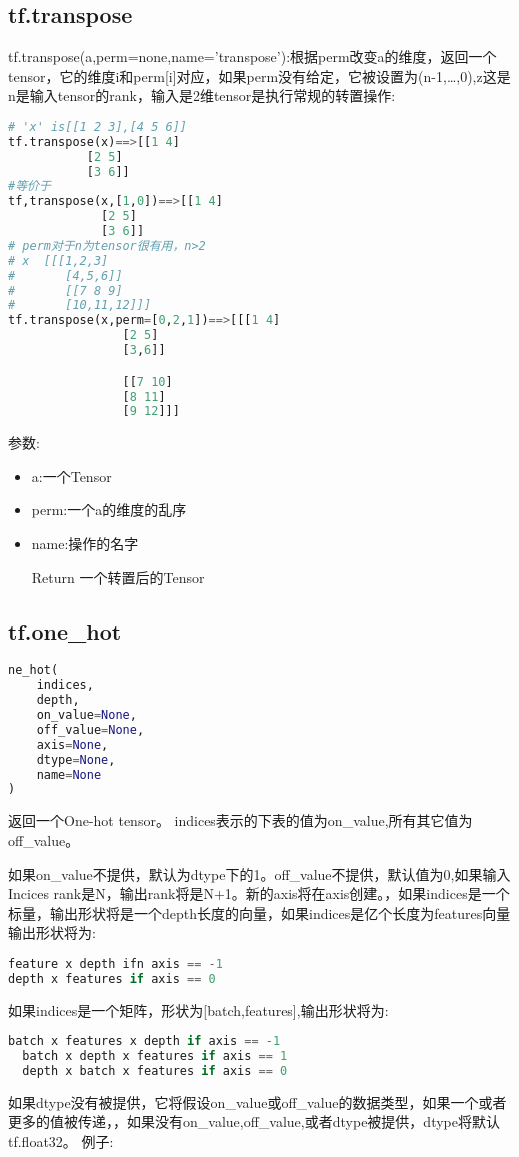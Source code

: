 \subsection{tf.transpose}
tf.transpose(a,perm=none,name='transpose'):根据perm改变a的维度，返回一个tensor，它的维度i和perm[i]对应，如果perm没有给定，它被设置为(n-1,\ldots,0),z这是n是输入tensor的rank，输入是2维tensor是执行常规的转置操作:
\begin{lstlisting}[language=Python]
# 'x' is[[1 2 3],[4 5 6]]
tf.transpose(x)==>[[1 4]
		   [2 5]
		   [3 6]]
#等价于
tf,transpose(x,[1,0])==>[[1 4]
			 [2 5]
			 [3 6]]
# perm对于n为tensor很有用，n>2
# x  [[[1,2,3]
#       [4,5,6]]
#       [[7 8 9]
#       [10,11,12]]]
tf.transpose(x,perm=[0,2,1])==>[[[1 4]
				[2 5]
				[3,6]]

				[[7 10]
				[8 11]
				[9 12]]]
\end{lstlisting}
参数:
\begin{itemize}
	\item a:一个Tensor
	\item perm:一个a的维度的乱序
	\item name:操作的名字
	\item[Return] 一个转置后的Tensor
\end{itemize}
\subsection{tf.one\_hot}
\begin{lstlisting}[language=Python]
ne_hot(
    indices,
    depth,
    on_value=None,
    off_value=None,
    axis=None,
    dtype=None,
    name=None
)
\end{lstlisting}
返回一个One-hot tensor。
indices表示的下表的值为on\_value,所有其它值为off\_value。

如果on\_value不提供，默认为dtype下的1。off\_value不提供，默认值为0,如果输入Incices rank是N，输出rank将是N+1。新的axis将在axis创建。，如果indices是一个标量，输出形状将是一个depth长度的向量，如果indices是亿个长度为features向量输出形状将为:
\begin{lstlisting}[language=Python]
feature x depth ifn axis == -1
depth x features if axis == 0
\end{lstlisting}
如果indices是一个矩阵，形状为[batch,features],输出形状将为:
\begin{lstlisting}[language=Python]
 batch x features x depth if axis == -1
  batch x depth x features if axis == 1
  depth x batch x features if axis == 0
\end{lstlisting}
如果dtype没有被提供，它将假设on\_value或off\_value的数据类型，如果一个或者更多的值被传递，，如果没有on\_value,off\_value,或者dtype被提供，dtype将默认tf.float32。
例子:

